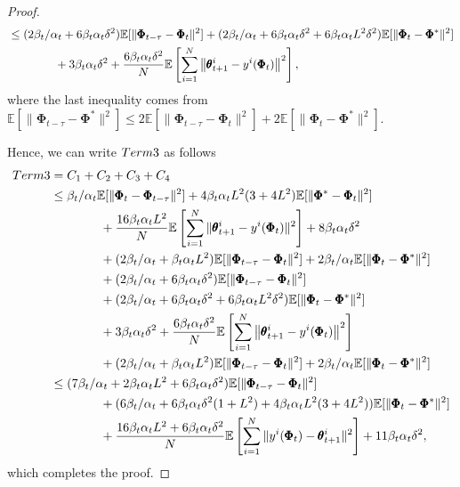 \documentclass[10pt,a4paper]{amsart}
\begin{document}
\begin{proof}
\begin{align*}
    &\leq (2\beta_t/\alpha_t+6\beta_t\alpha_t\delta^2)\mathbb{E}[\|\pmb{\Phi}_{t-\tau}-\pmb{\Phi}_t\|^2]+(2\beta_t/\alpha_t+6\beta_t\alpha_t\delta^2+6\beta_t\alpha_tL^2\delta^2)\mathbb{E}[\|\pmb{\Phi}_t-\pmb{\Phi}^*\|^2]\allowdisplaybreaks\\
    &\qquad\qquad+3\beta_t\alpha_t\delta^2+\frac{6\beta_t\alpha_t\delta^2}{N}\mathbb{E}\left[\sum_{i=1}^N\left\|\pmb{\theta}_{t+1}^i-y^i(\pmb{\Phi}_t)\right\|^2\right],
\end{align*}
where the last inequality comes from $\mathbb{E}[\|\pmb{\Phi}_{t-\tau}-\pmb{\Phi}^*\|^2]\leq 2\mathbb{E}[\|\pmb{\Phi}_{t-\tau}-\pmb{\Phi}_t\|^2]+2\mathbb{E}[\|\pmb{\Phi}_{t}-\pmb{\Phi}^*\|^2]$.

Hence, we can write $\textnormal{Term 3}$ as follows
\begin{align*}
    \textnormal{Term 3} &= C_1+C_2+C_3+C_4\allowdisplaybreaks\\
    &\leq \beta_t/\alpha_t\mathbb{E}[\|\pmb{\Phi}_t-\pmb{\Phi}_{t-\tau}\|^2] +4\beta_t \alpha_tL^2 (3+4L^2)\mathbb{E}[\|\pmb{\Phi}^*-\pmb{\Phi}_t\|^2]\nonumber\allowdisplaybreaks\\
    &\qquad\qquad+\frac{16\beta_t
     \alpha_t L^2}{N}\mathbb{E}\left[\sum_{i=1}^N\|\pmb{\theta}_{t+1}^i-y^i(\pmb{\Phi}_t)\|^2\right]+8\beta_t\alpha_t\delta^2\allowdisplaybreaks\\
    &\qquad\qquad+(2\beta_t/\alpha_t+\beta_t\alpha_t L^2)\mathbb{E}[\|\pmb{\Phi}_{t-\tau}-\pmb{\Phi}_t\|^2]+2\beta_t/\alpha_t\mathbb{E}[\|\pmb{\Phi}_t-\pmb{\Phi}^*\|^2]\allowdisplaybreaks\\
    &\qquad\qquad+(2\beta_t/\alpha_t+6\beta_t\alpha_t\delta^2)\mathbb{E}[\|\pmb{\Phi}_{t-\tau}-\pmb{\Phi}_t\|^2]\allowdisplaybreaks\\
    &\qquad\qquad+(2\beta_t/\alpha_t+6\beta_t\alpha_t\delta^2+6\beta_t\alpha_tL^2\delta^2)\mathbb{E}[\|\pmb{\Phi}_t-\pmb{\Phi}^*\|^2]\allowdisplaybreaks\\
    &\qquad\qquad+3\beta_t\alpha_t\delta^2+\frac{6\beta_t\alpha_t\delta^2}{N}\mathbb{E}\left[\sum_{i=1}^N\left\|\pmb{\theta}_{t+1}^i-y^i(\pmb{\Phi}_t)\right\|^2\right]\allowdisplaybreaks\\
    &\qquad\qquad+(2\beta_t/\alpha_t+\beta_t\alpha_t L^2)\mathbb{E}[\|\pmb{\Phi}_{t-\tau}-\pmb{\Phi}_t\|^2]+2\beta_t/\alpha_t\mathbb{E}[\|\pmb{\Phi}_t-\pmb{\Phi}^*\|^2]\allowdisplaybreaks\\
    &\leq (7\beta_t/\alpha_t+2\beta_t\alpha_t L^2+6\beta_t\alpha_t\delta^2)\mathbb{E}[\|\pmb{\Phi}_{t-\tau}-\pmb{\Phi}_t\|^2]\allowdisplaybreaks\\
    &\qquad\qquad+(6\beta_t/\alpha_t+6\beta_t\alpha_t\delta^2(1+L^2) +4\beta_t\alpha_tL^2(3+4L^2))\mathbb{E}[\|\pmb{\Phi}_t-\pmb{\Phi}^*\|^2]\allowdisplaybreaks\\
    &\qquad\qquad+\frac{16\beta_t \alpha_t L^2+6\beta_t\alpha_t\delta^2}{N}\mathbb{E}\left[\sum_{i=1}^N\|y^i(\pmb{\Phi}_t)-\pmb{\theta}^i_{t+1}\|^2\right]+11\beta_t\alpha_t\delta^2,
\end{align*}
which completes the proof.
\end{proof}
\end{document}
